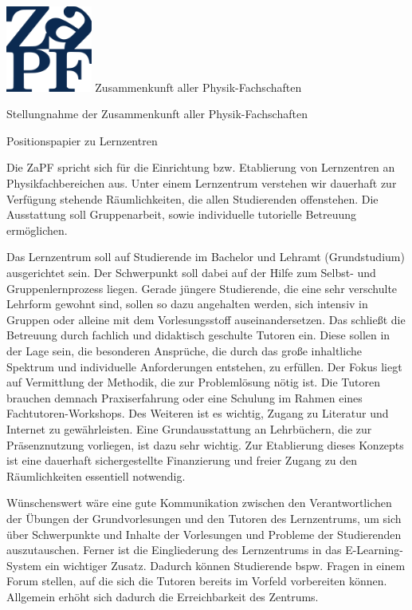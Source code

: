 \documentclass[DIV=calc]{scrartcl}
\begin{document}
\hspace{0.87\textwidth}
\begin{minipage}{120pt}
\vspace{-1.8cm}
\includegraphics[width=80pt]{logo.pdf}
\centering
\small Zusammenkunft aller Physik-Fachschaften
\end{minipage}
\begin{center}
\huge{Stellungnahme der Zusammenkunft aller Physik-Fachschaften} \\
\normalsize
\end{center}


Positionspapier zu Lernzentren

Die ZaPF spricht sich für die Einrichtung bzw. Etablierung von Lernzentren an Physikfachbereichen aus.
Unter einem Lernzentrum verstehen wir dauerhaft zur Verfügung stehende Räumlichkeiten, die allen Studierenden offenstehen. Die Ausstattung soll Gruppenarbeit, sowie individuelle tutorielle Betreuung ermöglichen.

Das Lernzentrum soll auf Studierende im Bachelor und Lehramt (Grundstudium) ausgerichtet sein. Der Schwerpunkt soll dabei auf der Hilfe zum Selbst- und Gruppenlernprozess liegen.
Gerade jüngere Studierende, die eine sehr verschulte Lehrform gewohnt sind, sollen so dazu angehalten werden, sich intensiv in Gruppen oder alleine mit dem Vorlesungsstoff  auseinandersetzen. 
Das schließt die Betreuung durch fachlich und didaktisch geschulte Tutoren ein. Diese sollen in der Lage sein, die besonderen Ansprüche, die durch das große inhaltliche Spektrum und individuelle Anforderungen entstehen, zu erfüllen. Der Fokus liegt auf Vermittlung der Methodik, die zur Problemlösung nötig ist. Die Tutoren brauchen demnach Praxiserfahrung oder eine Schulung im Rahmen eines Fachtutoren-Workshops.
Des Weiteren ist es wichtig, Zugang zu Literatur und Internet zu gewährleisten. Eine Grundausstattung an Lehrbüchern, die zur Präsenznutzung vorliegen, ist dazu sehr wichtig.
Zur Etablierung dieses Konzepts ist eine dauerhaft sichergestellte Finanzierung und freier Zugang zu den Räumlichkeiten essentiell notwendig.

Wünschenswert wäre eine gute Kommunikation zwischen den Verantwortlichen der Übungen der Grundvorlesungen und den Tutoren des Lernzentrums, um sich über Schwerpunkte und Inhalte der Vorlesungen und Probleme der Studierenden auszutauschen.
Ferner ist die Eingliederung des Lernzentrums in das E-Learning-System ein wichtiger Zusatz. Dadurch können Studierende bspw. Fragen in einem Forum stellen, auf die sich die Tutoren bereits im Vorfeld vorbereiten können. Allgemein erhöht sich dadurch die Erreichbarkeit des Zentrums.
\end{document}
